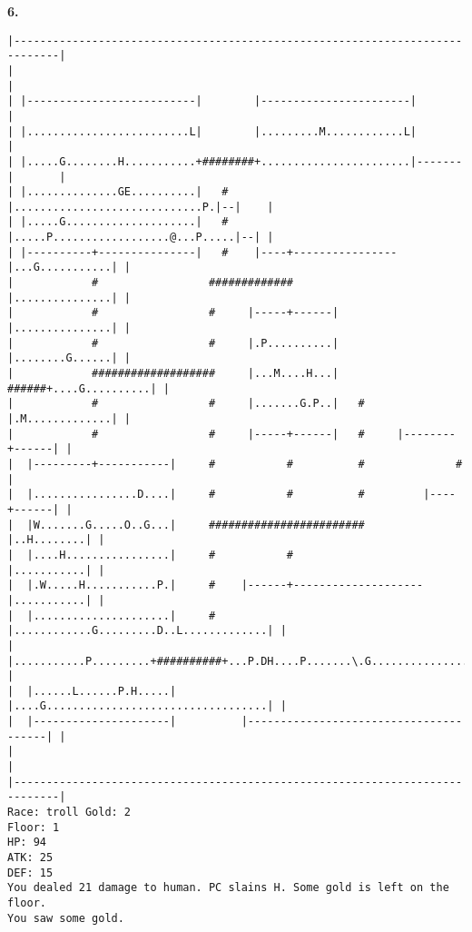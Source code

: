 \documentclass[11pt]{article}
\theoremstyle{plain}
\begin{document}
\newpage
\textbf{6. }
\begin{Verbatim}[fontsize=\scriptsize]
|-----------------------------------------------------------------------------|
|                                                                             |
| |--------------------------|        |-----------------------|               |
| |.........................L|        |.........M............L|               |
| |.....G........H...........+########+.......................|-------|       |
| |..............GE..........|   #    |.............................P.|--|    |
| |.....G....................|   #    |.....P..................@...P.....|--| |
| |----------+---------------|   #    |----+----------------|...G...........| |
|            #                 #############                |...............| |
|            #                 #     |-----+------|         |...............| |
|            #                 #     |.P..........|         |........G......| |
|            ###################     |...M....H...|   ######+....G..........| |
|            #                 #     |.......G.P..|   #     |.M.............| |
|            #                 #     |-----+------|   #     |--------+------| |
|  |---------+-----------|     #           #          #              #        |
|  |................D....|     #           #          #         |----+------| |
|  |W.......G.....O..G...|     ########################         |..H........| |
|  |....H................|     #           #                    |...........| |
|  |.W.....H...........P.|     #    |------+--------------------|...........| |
|  |.....................|     #    |............G.........D..L.............| |
|  |...........P.........+##########+...P.DH....P.......\.G................W| |
|  |......L......P.H.....|          |....G..................................| |
|  |---------------------|          |---------------------------------------| |
|                                                                             |
|-----------------------------------------------------------------------------|
Race: troll Gold: 2                                                    Floor: 1
HP: 94
ATK: 25
DEF: 15
You dealed 21 damage to human. PC slains H. Some gold is left on the floor. 
You saw some gold. 
\end{Verbatim}
\end{document}
